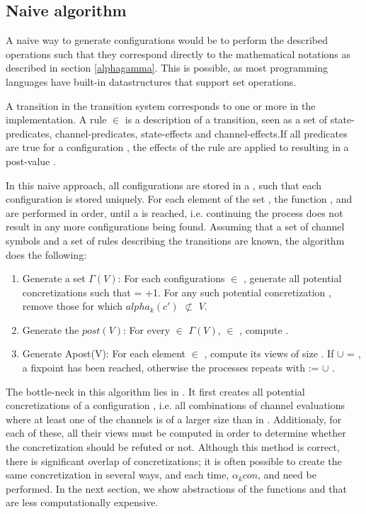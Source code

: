 \subsection{Naive algorithm}
A naive way to generate configurations would be to perform the described operations such that they correspond directly to the mathematical notations as described in section \ref{alphagamma}. This is possible, as most programming languages have built-in datastructures that support set operations.

A transition in the transition system corresponds to one or more  in the implementation. A rule  $\in$  is a description of a transition, seen as a set of state-predicates, channel-predicates, state-effects and channel-effects.If all predicates are true for a configuration , the effects of the rule are applied to  resulting in a post-value .

In this naive approach, all configurations are stored in a , such that each configuration is stored uniquely. For each element  of the set , the function ,  and  are performed in order, until a  is reached, i.e. continuing the process does not result in any more configurations being found. Assuming that a set of channel symbols and a set of rules  describing the transitions are known, the algorithm does the following:

\begin{enumerate}
\item
Generate a set $\Gamma(V)$: For each configurations  $\in$ , generate all potential concretizations  such that  = +1. For any such potential concretization , remove those for which $alpha_k(c')$ $\not\subset$ $V$.

\item
Generate the $post(V)$: For every  $\in$ $\Gamma(V)$,  $\in$ , compute .

\item
Generate Apost(V): For each element  $\in$ , compute its views of size . If  $\cup$  = , a fixpoint has been reached, otherwise the processes repeats with  :=  $\cup$ .
\end{enumerate}

The bottle-neck in this algorithm lies in . It first creates all potential concretizations of a configuration , i.e. all combinations of channel evaluations where at least one of the channels is of a larger size than in . Additionaly, for each of these, all their views must be computed in order to determine whether the concretization should be refuted or not. Although this method is correct, there is significant overlap of concretizations; it is often possible to create the same concretization  in several ways, and each time, $\alpha_k{con}$,  and  need be performed. In the next section, we show abstractions of the functions  and  that are less computationally expensive.



